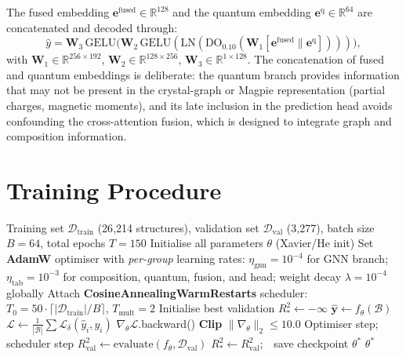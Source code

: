 \documentclass[conference]{IEEEtran}
\begin{document}
The fused embedding $\mathbf{e}^{\text{fused}}\in\mathbb{R}^{128}$ and the
quantum embedding $\mathbf{e}^{\text{q}}\in\mathbb{R}^{64}$ are
concatenated and decoded through:
\begin{equation}
  \hat{y} = \mathbf{W}_3\,\mathrm{GELU}\!\bigl(
              \mathbf{W}_2\,\mathrm{GELU}(
                \mathrm{LN}(
                  \mathrm{DO}_{0.10}(
                    \mathbf{W}_1[\mathbf{e}^{\text{fused}}\|\mathbf{e}^{\text{q}}]
                  )
                )
              )
            \bigr),
  \label{eq:head1}
\end{equation}
with $\mathbf{W}_1\in\mathbb{R}^{256\times192}$,
$\mathbf{W}_2\in\mathbb{R}^{128\times256}$,
$\mathbf{W}_3\in\mathbb{R}^{1\times128}$.
The concatenation of fused and quantum embeddings is deliberate: the quantum
branch provides information that may not be present in the crystal-graph or
Magpie representation (partial charges, magnetic moments), and its late
inclusion in the prediction head avoids confounding the cross-attention
fusion, which is designed to integrate graph and composition information.

\section{Training Procedure}
\label{sec:training}

\begin{algorithm}[!t]
\caption{Hybrid Model Training}
\label{alg:train}
\begin{algorithmic}[1]
\REQUIRE Training set $\mathcal{D}_{\text{train}}$ (26{,}214 structures),
         validation set $\mathcal{D}_{\text{val}}$ (3{,}277),
         batch size $B=64$, total epochs $T=150$
\STATE Initialise all parameters $\theta$ (Xavier/He init)
\STATE Set \textbf{AdamW} optimiser with \emph{per-group} learning rates:
       $\eta_{\text{gnn}}=10^{-4}$ for GNN branch;
       $\eta_{\text{tab}}=10^{-3}$ for composition, quantum, fusion,
       and head;
       weight decay $\lambda=10^{-4}$ globally
\STATE Attach \textbf{CosineAnnealingWarmRestarts}
       scheduler: $T_0 = 50\cdot\lceil|\mathcal{D}_{\text{train}}|/B\rceil$,
       $T_{\text{mult}} = 2$
\STATE Initialise best validation $R^2_* \leftarrow -\infty$
    \STATE $\hat{\mathbf{y}} \leftarrow f_\theta(\mathcal{B})$
    \STATE $\mathcal{L} \leftarrow \frac{1}{|\mathcal{B}|}
           \sum \mathcal{L}_\delta(\hat{y}_i, y_i)$
           \hfill{}
    \STATE $\nabla_\theta\mathcal{L}$.backward()
    \STATE \textbf{Clip} $\|\nabla_\theta\|_2 \leq 10.0$
    \STATE Optimiser step; scheduler step
  \ENDFOR
  \STATE $R^2_{\text{val}} \leftarrow \text{evaluate}(f_\theta,
         \mathcal{D}_{\text{val}})$
    \STATE $R^2_* \leftarrow R^2_{\text{val}}$;\ \
           save checkpoint $\theta^*$
  \ENDIF
\ENDFOR
\RETURN $\theta^*$
\end{algorithmic}
\end{algorithm}
\end{document}
